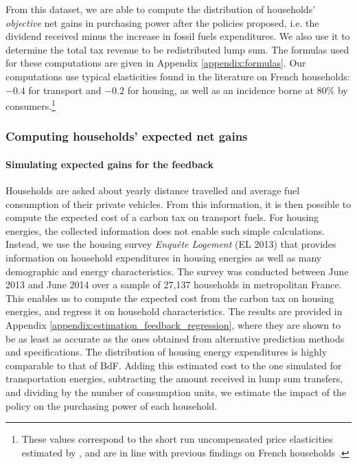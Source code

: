 \documentclass[12pt]{article} %
\begin{document}
From this dataset, we are able to compute the distribution of households' \textit{objective} net gains in purchasing power after the policies proposed, i.e. the dividend received minus the increase in fossil fuels expenditures. We also use it to determine the total tax revenue to be redistributed lump sum. The formulas used for these computations are given in Appendix \ref{appendix:formulas}. Our computations use typical elasticities found in the literature on French households: $-0.4$ for transport and $-0.2$ for housing, as well as an incidence borne at 80\% by consumers.\footnote{These values correspond to the short run uncompensated price elasticities estimated by \citet{douenne_2020}, and are in line with previous findings on French households \citep[e.g.][]{clerc_marcus,bureau_distributional_2011}.} 
    \subsubsection{Computing households' expected net gains\label{subsubsec:computation_feedback}}

\paragraph{Simulating expected gains for the feedback}
Households are asked about yearly distance travelled and average fuel consumption of their private vehicles. From this information, it is then possible to compute the expected cost of a carbon tax on transport fuels. For housing energies, the collected information does not enable such simple calculations. Instead, we use the housing survey \emph{Enquête Logement} (EL 2013) that provides information on household expenditures in housing energies as well as many demographic and energy characteristics. The survey was conducted between June 2013 and June 2014 over a sample of 27,137 households in metropolitan France. This enables us to compute the expected cost from the carbon tax on housing energies, and regress it on household characteristics. The results are provided in Appendix \ref{appendix:estimation_feedback_regression}, where they are shown to be as least as accurate as the ones obtained from alternative prediction methods and specifications. The distribution of housing energy expenditures is highly comparable to that of BdF. Adding this estimated cost to the one simulated for transportation energies, subtracting the amount received in lump sum transfers, and dividing by the number of consumption units, we estimate the impact of the policy on the purchasing power of each household.
\end{document}
